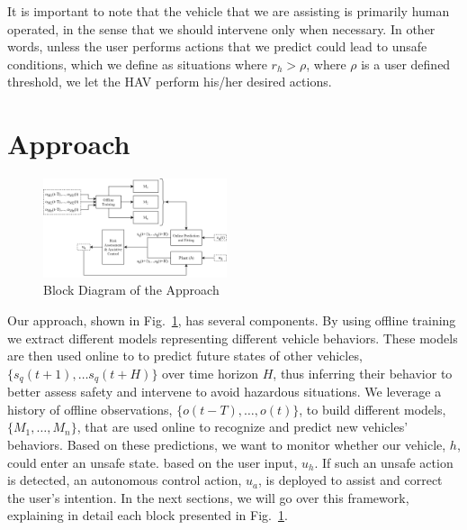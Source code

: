 \documentclass[letterpaper, 10 pt, conference]{ieeeconf}  %
\newcommand\NB[1]{$\spadesuit$\footnote{NB: #1}}
\begin{document}
    It is important to note that the vehicle that we are assisting is primarily human operated, in the sense that we should intervene only when necessary. %
    In other words, unless the user performs actions that we predict could lead to unsafe conditions, which we define as situations where $r_h>\rho$, where $\rho$ is a user defined threshold, we let the HAV perform his/her desired actions.

\section{Approach} \label{sec:approach}%
\begin{figure}[ht]
    \includegraphics[width=0.48\textwidth]{approach.png}
    \caption{Block Diagram of the Approach}
    \label{fig:app}
\end{figure}
Our approach, shown in Fig.~\ref{fig:app}, has several components. By using offline training we extract different models representing different vehicle behaviors. These models are then used online to to predict future states of other vehicles, $\{s_q(t+1),\ldots s_q(t+H)\}$ over time horizon $H$, thus inferring their behavior to better assess safety and intervene to avoid hazardous situations. We leverage a history of offline observations, $\{o(t-T),\ldots,o(t)\}$, to build different models, $\{M_1,\ldots,M_n\}$, that are used online to recognize and predict new vehicles' behaviors. Based on these predictions, we want to monitor whether our vehicle, $h$, could enter an unsafe state.
 based on the user input, $u_h$. 
 If such an unsafe action is detected, an autonomous control action, $u_a$, is deployed to assist and correct the user's intention. In the next sections, we will go over this framework, explaining in detail each block presented in Fig.~\ref{fig:app}.
 
\end{document}
